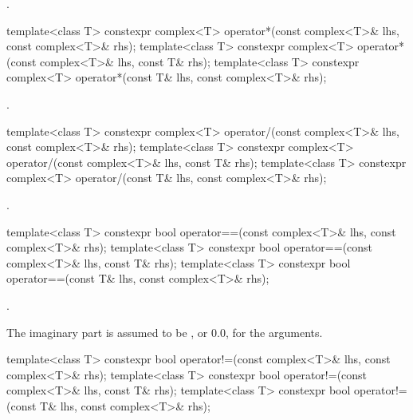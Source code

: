 \begin{itemdescr}
\pnum
\returns
{}.
\end{itemdescr}

%
\begin{itemdecl}
template<class T> constexpr complex<T> operator*(const complex<T>& lhs, const complex<T>& rhs);
template<class T> constexpr complex<T> operator*(const complex<T>& lhs, const T& rhs);
template<class T> constexpr complex<T> operator*(const T& lhs, const complex<T>& rhs);
\end{itemdecl}

\begin{itemdescr}
\pnum
\returns
{}.
\end{itemdescr}

%
\begin{itemdecl}
template<class T> constexpr complex<T> operator/(const complex<T>& lhs, const complex<T>& rhs);
template<class T> constexpr complex<T> operator/(const complex<T>& lhs, const T& rhs);
template<class T> constexpr complex<T> operator/(const T& lhs, const complex<T>& rhs);
\end{itemdecl}

\begin{itemdescr}
\pnum
\returns
{}.
\end{itemdescr}

%
\begin{itemdecl}
template<class T> constexpr bool operator==(const complex<T>& lhs, const complex<T>& rhs);
template<class T> constexpr bool operator==(const complex<T>& lhs, const T& rhs);
template<class T> constexpr bool operator==(const T& lhs, const complex<T>& rhs);
\end{itemdecl}

\begin{itemdescr}
\pnum
\returns
{}.

\pnum
\remarks
The imaginary part is assumed to be
,
or 0.0, for the
arguments.
\end{itemdescr}

%
\begin{itemdecl}
template<class T> constexpr bool operator!=(const complex<T>& lhs, const complex<T>& rhs);
template<class T> constexpr bool operator!=(const complex<T>& lhs, const T& rhs);
template<class T> constexpr bool operator!=(const T& lhs, const complex<T>& rhs);
\end{itemdecl}

